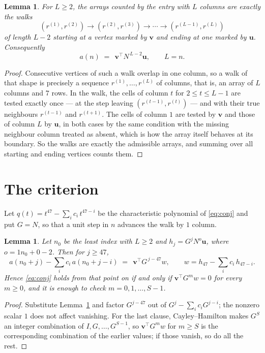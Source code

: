 \documentclass[11pt,a4paper]{article}
\theoremstyle{plain}
\newtheorem{lemma}[theorem]{Lemma}
\theoremstyle{definition}
\begin{document}
\begin{lemma}\label{lem:walk}
For $L\ge2$, the arrays counted by the entry with $L$ columns are exactly the walks
\[
(r^{(1)},r^{(2)})\to(r^{(2)},r^{(3)})\to\cdots\to(r^{(L-1)},r^{(L)})
\]
of length $L-2$ starting at a vertex marked by $\mathbf{v}$ and ending at one marked by
$\mathbf{u}$. Consequently
\[
a(n)\;=\;\,\mathbf{v}^{\!\top}N^{\,L-2}\mathbf{u},\qquad L=n .
\]
\end{lemma}

\begin{proof}
Consecutive vertices of such a walk overlap in one column, so a walk of that shape is
precisely a sequence $r^{(1)},\dots,r^{(L)}$ of columns, that is, an array of $L$ columns
and $7$ rows. In the walk, the cells of column $t$ for $2\le t\le L-1$ are tested
exactly once --- at the step leaving $(r^{(t-1)},r^{(t)})$ --- and with their true
neighbours $r^{(t-1)}$ and $r^{(t+1)}$. The cells of column $1$ are tested by
$\mathbf{v}$ and those of column $L$ by $\mathbf{u}$, in both cases by the same condition
with the missing neighbour column treated as absent, which is how the array itself behaves at
its boundary. So the walks are exactly the admissible arrays, and summing over all starting
and ending vertices counts them.
\end{proof}

\section{The criterion}

Let $q(t)=t^{47}-\sum_i c_i\,t^{47-i}$ be the characteristic polynomial of
\eqref{eq:conj} and put $G=N$, so that a unit step in $n$ advances the walk by
$1$ column.

\begin{lemma}\label{lem:crit}
Let $n_0$ be the least index with $L\ge2$ and $h_j=G^{j}N^{o}\mathbf{u}$, where
$o=1n_0+0-2$. Then for $j\ge47$,
\[
a(n_0+j)-\sum_i c_i\,a(n_0+j-i)\;=\;\,\mathbf{v}^{\!\top}G^{\,j-47}w,
\qquad w=h_{47}-\sum_i c_i\,h_{47-i} .
\]
Hence \eqref{eq:conj} holds from that point on if and only if
$\mathbf{v}^{\!\top}G^{m}w=0$ for every $m\ge0$, and it is enough to check
$m=0,1,\dots,S-1$.
\end{lemma}

\begin{proof}
Substitute Lemma~\ref{lem:walk} and factor $G^{j-47}$ out of
$G^{j}-\sum_ic_iG^{j-i}$; the nonzero scalar $1$ does not affect
vanishing. For the last clause, Cayley--Hamilton makes $G^{S}$ an integer combination of
$I,G,\dots,G^{S-1}$, so $\mathbf{v}^{\!\top}G^{m}w$ for $m\ge S$ is the corresponding
combination of the earlier values; if those vanish, so do all the rest.
\end{proof}
\end{document}
